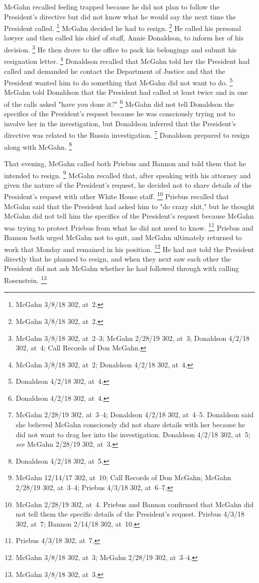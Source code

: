 McGahn recalled feeling trapped because he did not plan to follow the President's directive but did not know what he would say the next time the President called.%
\footnote{McGahn 3/8/18 302, at~2.}
McGahn decided he had to resign.%
\footnote{McGahn 3/8/18 302, at~2.}
He called his personal lawyer and then called his chief of staff, Annie Donaldson, to inform her of his decision.%
\footnote{McGahn 3/8/18 302, at~2--3;
McGahn 2/28/19 302, at~3;
Donaldson 4/2/18 302, at~4;
Call Records of Don McGahn.}
He then drove to the office to pack his belongings and submit his resignation letter.%
\footnote{McGahn 3/8/18 302, at~2;
Donaldson 4/2/18 302, at~4.}
Donaldson recalled that McGahn told her the President had called and demanded he contact the Department of Justice and that the President wanted him to do something that McGahn did not want to do.%
\footnote{Donaldson 4/2/18 302, at~4.}
McGahn told Donaldson that the President had called at least twice and in one of the calls asked "have you done it?"%
\footnote{Donaldson 4/2/18 302, at~4.}
McGahn did not tell Donaldson the specifics of the President's request because he was consciously trying not to involve her in the investigation, but Donaldson inferred that the President's directive was related to the Russia investigation.%
\footnote{McGahn 2/28/19 302, at~3--4;
Donaldson 4/2/18 302, at~4--5.
Donaldson said she believed McGahn consciously did not share details with her because he did not want to drag her into the investigation.
Donaldson 4/2/18 302, at~5;
\textit{see} McGahn 2/28/19 302, at~3.}
Donaldson prepared to resign along with McGahn.%
\footnote{Donaldson 4/2/18 302, at~5.}

That evening, McGahn called both Priebus and Bannon and told them that he intended to resign.%
\footnote{McGahn 12/14/17 302, at~10;
Call Records of Don McGahn;
McGahn 2/28/19 302, at~3--4;
Priebus 4/3/18 302, at~6--7.}
McGahn recalled that, after speaking with his attorney and given the nature of the President's request, he decided not to share details of the President's request with other White House staff.%
\footnote{McGahn 2/28/19 302, at~4.
Priebus and Bannon confirmed that McGahn did not tell them the specific details of the President's request.
Priebus 4/3/18 302, at~7;
Bannon 2/14/18 302, at~10.}
Priebus recalled that McGahn said that the President had asked him to "do crazy shit," but he thought McGahn did not tell him the specifics of the President's request because McGahn was trying to protect Priebus from what he did not need to know.%
\footnote{Priebus 4/3/18 302, at~7.}
Priebus and Bannon both urged McGahn not to quit, and McGahn ultimately returned to work that Monday and remained in his position.%
\footnote{McGahn 3/8/18 302, at~3;
McGahn 2/28/19 302, at~3--4.}
He had not told the President directly that he planned to resign, and when they next saw each other the President did not ask McGahn whether he had followed through with calling Rosenstein.%
\footnote{McGahn 3/8/18 302, at~3.}

